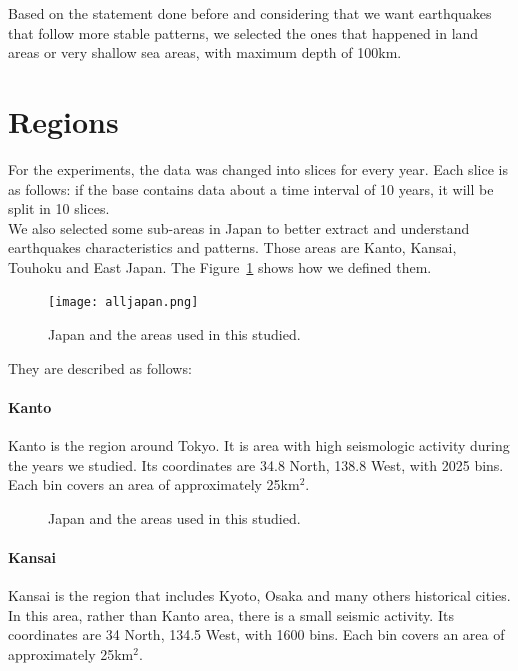 Based on the statement done before and considering that we want earthquakes that follow more stable patterns, we selected the ones that happened in land areas or very shallow sea areas, with maximum depth of 100km.\\

\section{Regions}
For the experiments, the data was changed into slices for every year. Each slice is as follows: if the base contains data about a time interval of 10 years, it will be split in 10 slices.\\

We also selected some sub-areas in Japan to better extract and understand earthquakes characteristics and patterns. Those areas are Kanto, Kansai, Touhoku and East Japan. The Figure~\ref{alljapan} shows how we defined them. 

\begin{figure}[H]
	\centering
	\texttt{[image: alljapan.png]}
	\caption{Japan and the areas used in this studied.}
	\label{alljapan}
\end{figure}


They are described as follows:

\paragraph{Kanto} Kanto is the region around Tokyo. It is area with high seismologic activity during the years we studied. Its coordinates are 34.8 North, 138.8 West, with  2025 bins. Each bin covers an area of approximately 25km$^2$.\\

\begin{figure}[H]
	\centering
	\caption{Japan and the areas used in this studied.}
	\label{kanto}
\end{figure}


\paragraph{Kansai} Kansai is the region that includes Kyoto, Osaka and many others historical cities. In this area, rather than Kanto area, there is a small seismic activity. Its coordinates are 34 North, 134.5 West, with 1600 bins. Each bin covers an area of approximately 25km$^2$.\\

